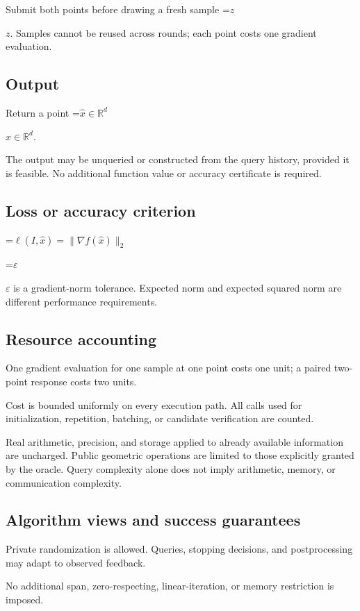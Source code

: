 \documentclass[10pt,a4paper]{article}
\newcommand{\AtlasMath}[1]{\par\begingroup\centering\setbox0=\hbox{$\displaystyle #1$}\ifdim\wd0>1.4\linewidth\typeout{ATLAS WIDE FORMULA: \the\wd0}\fi\ifdim\wd0>\linewidth\resizebox{\linewidth}{!}{\box0}\else\box0\fi\par\endgroup}
\newcommand{\AtlasInlineMath}[1]{\begingroup\setbox0=\hbox{$#1$}\ifdim\wd0>.4\linewidth\endgroup\AtlasMath{#1}\else\endgroup$#1$\fi}
\begin{document}
Submit both points before drawing a fresh sample \AtlasInlineMath{z}. Samples cannot be reused across rounds; each point costs one gradient evaluation.

\subsection{Output}
Return a point \AtlasInlineMath{\widehat x\in\mathbb R^d}.

The output may be unqueried or constructed from the query history, provided it is feasible. No additional function value or accuracy certificate is required.

\subsection{Loss or accuracy criterion}

\AtlasMath{\ell(I,\widehat{x})=\|\nabla f(\widehat{x})\|_2}


\AtlasInlineMath{\varepsilon} is a gradient-norm tolerance. Expected norm and expected squared norm are different performance requirements.

\subsection{Resource accounting}
One gradient evaluation for one sample at one point costs one unit; a paired two-point response costs two units.

Cost is bounded uniformly on every execution path. All calls used for initialization, repetition, batching, or candidate verification are counted.

Real arithmetic, precision, and storage applied to already available information are uncharged. Public geometric operations are limited to those explicitly granted by the oracle. Query complexity alone does not imply arithmetic, memory, or communication complexity.

\subsection{Algorithm views and success guarantees}
Private randomization is allowed. Queries, stopping decisions, and postprocessing may adapt to observed feedback.

No additional span, zero-respecting, linear-iteration, or memory restriction is imposed.
\end{document}
